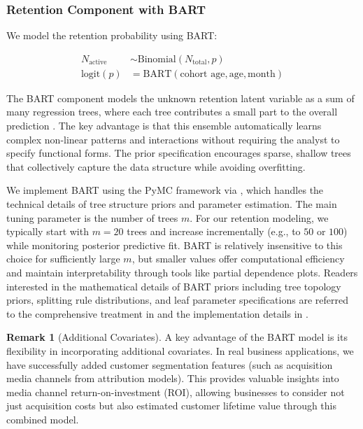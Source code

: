 \documentclass[11pt]{amsart}
\theoremstyle{definition}
\newtheorem{remark}{Remark}
\begin{document}
\subsubsection{Retention Component with BART}

We model the retention probability using BART:

\begin{align*}
    N_{\text{active}} & \sim \text{Binomial}(N_{\text{total}}, p)                  \\
    \textrm{logit}(p) & = \text{BART}(\text{cohort age}, \text{age}, \text{month})
\end{align*}

The BART component models the unknown retention latent variable as a sum of many regression trees, where
each tree contributes a small part to the overall prediction \cite{chipman2010bart}. The key advantage is that this ensemble
automatically learns complex non-linear patterns and interactions without requiring the analyst to specify functional forms.
The prior specification encourages sparse, shallow trees that collectively capture the data structure while avoiding overfitting.

We implement BART using the PyMC framework via \cite{quiroga2022bart}, which handles the technical details of tree structure
priors and parameter estimation. The main tuning parameter is the number of trees $m$. For our retention
modeling, we typically start with $m = 20$ trees and increase incrementally (e.g., to $50$ or $100$) while monitoring posterior
predictive fit. BART is relatively insensitive to this choice for sufficiently large $m$, but smaller values offer
computational efficiency and maintain interpretability through tools like partial dependence plots.
Readers interested in the mathematical details of BART priors including tree topology priors, splitting rule distributions,
and leaf parameter specifications are referred to the comprehensive treatment in \cite{chipman2010bart} and the implementation
details in \cite{quiroga2022bart}.

\begin{remark}[Additional Covariates]
    A key advantage of the BART model is its flexibility in incorporating additional covariates. In real business
    applications, we have successfully added customer segmentation features (such as acquisition media channels from
    attribution models). This provides valuable insights into media channel return-on-investment (ROI), allowing businesses
    to consider not just acquisition costs but also estimated customer lifetime value through this combined model.
\end{remark}
\end{document}
